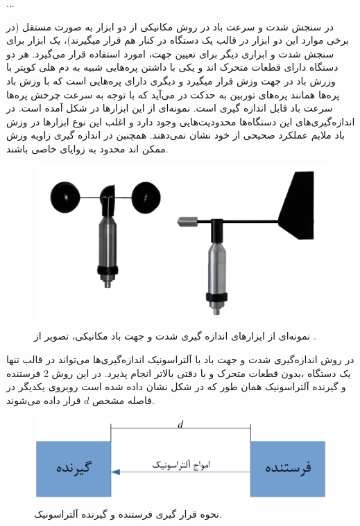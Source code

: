 ...

در سنجش شدت و سرعت باد در روش مکانیکی از دو ابزار به صورت مستقل (در برخی موارد این دو ابزار در قالب یک دستگاه در کنار هم قرار میگیرند)، یک ابزار برای سنجش شدت و ابزاری دیگر برای تعیین جهت، امورد استفاده قرار می‌گیرد. هر دو دستگاه دارای قطعات متحرک اند و یکی با داشتن پره‌هایی شبیه به دم هلی کوپتر با وزرش باد در جهت وزش قرار میگیرد و دیگری دارای پره‌هایی است که با وزش باد پره‌ها همانند پره‌های توربین به حدکت در می‌آید که با توجه به سرعت چرخش پره‌ها سرعت باد قابل اندازه‌ گیری است. نمونه‌ای از این ابزار‌ها در شکل  آمده است. در اندازه‌گیری‌های این دستگاه‌ها محدودیت‌هایی وجود دارد و اغلب این نوع ابزارها در وزش باد ملایم عملکرد صحیحی از خود نشان نمی‌دهند. همچنین در اندازه گیری زاویه وزش ممکن اند محدود به زوایای خاصی باشند. 

\begin{figure}[!h]
	\centering
	\includegraphics[width=0.7\linewidth]{Assets/wind speed and direction meter.png}
	\caption{نمونه‌ای از ایزار‌های اندازه گیری شدت و جهت باد مکانیکی، تصویر از .}
	\label{fig:mechanicalWindSensor}
\end{figure}

در روش اندازه‌گیری شدت و جهت باد با آلتراسونیک اندازه‌گیری‌ها می‌تواند در قالب تنها یک دستگاه ،بدون قطعات متحرک و با دقتی بالاتر انجام پذیرد. در این روش 2 فرستنده و گیرنده آلتراسونیک همان طور که در شکل  نشان داده شده است روبروی یکدیگر در فاصله‌ مشخص $d$ قرار داده می‌شوند.

\begin{figure}[!h]
	\centering
	\includegraphics[width=0.7\linewidth]{Assets/ultrasonic one axis.pdf}
	\caption{نحوه قرار گیری فرستنده و گیرنده آلتراسونیک.}
	\label{fig:oneAxisUltrasonic}
\end{figure}

